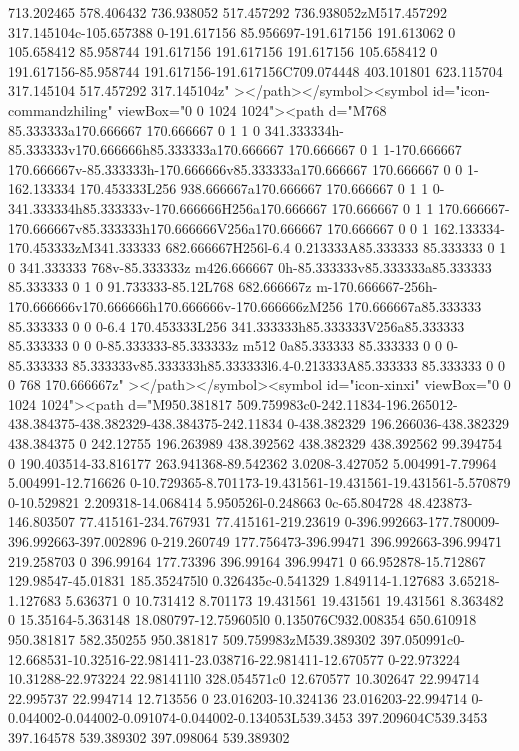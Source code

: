 {713.202465 578.406432 736.938052 517.457292 736.938052zM517.457292 317.145104c-105.657388 0-191.617156 85.956697-191.617156
191.613062 0 105.658412 85.958744 191.617156 191.617156 191.617156 105.658412 0 191.617156-85.958744
191.617156-191.617156C709.074448 403.101801 623.115704 317.145104 517.457292 317.145104z"  ></path></symbol><symbol
id="icon-commandzhiling" viewBox="0 0 1024 1024"><path d="M768 85.333333a170.666667 170.666667 0 1 1 0
341.333334h-85.333333v170.666666h85.333333a170.666667 170.666667 0 1 1-170.666667
170.666667v-85.333333h-170.666666v85.333333a170.666667 170.666667 0 0 1-162.133334 170.453333L256 938.666667a170.666667
170.666667 0 1 1 0-341.333334h85.333333v-170.666666H256a170.666667 170.666667 0 1 1
170.666667-170.666667v85.333333h170.666666V256a170.666667 170.666667 0 0 1 162.133334-170.453333zM341.333333 682.666667H256l-6.4
0.213333A85.333333 85.333333 0 1 0 341.333333 768v-85.333333z m426.666667 0h-85.333333v85.333333a85.333333 85.333333 0 1 0
91.733333-85.12L768 682.666667z m-170.666667-256h-170.666666v170.666666h170.666666v-170.666666zM256 170.666667a85.333333
85.333333 0 0 0-6.4 170.453333L256 341.333333h85.333333V256a85.333333 85.333333 0 0 0-85.333333-85.333333z m512 0a85.333333
85.333333 0 0 0-85.333333 85.333333v85.333333h85.333333l6.4-0.213333A85.333333 85.333333 0 0 0 768 170.666667z"
></path></symbol><symbol id="icon-xinxi" viewBox="0 0 1024 1024"><path d="M950.381817
509.759983c0-242.11834-196.265012-438.384375-438.382329-438.384375-242.11834 0-438.382329 196.266036-438.382329 438.384375 0
242.12755 196.263989 438.392562 438.382329 438.392562 99.394754 0 190.403514-33.816177 263.941368-89.542362 3.0208-3.427052
5.004991-7.79964 5.004991-12.716626 0-10.729365-8.701173-19.431561-19.431561-19.431561-5.570879 0-10.529821 2.209318-14.068414
5.950526l-0.248663 0c-65.804728 48.423873-146.803507 77.415161-234.767931 77.415161-219.23619
0-396.992663-177.780009-396.992663-397.002896 0-219.260749 177.756473-396.99471 396.992663-396.99471 219.258703 0 396.99164
177.73396 396.99164 396.99471 0 66.952878-15.712867 129.98547-45.01831 185.352475l0 0.326435c-0.541329 1.849114-1.127683
3.65218-1.127683 5.636371 0 10.731412 8.701173 19.431561 19.431561 19.431561 8.363482 0 15.35164-5.363148 18.080797-12.759605l0
0.135076C932.008354 650.610918 950.381817 582.350255 950.381817 509.759983zM539.389302
397.050991c0-12.668531-10.32516-22.981411-23.038716-22.981411-12.670577 0-22.973224 10.31288-22.973224 22.981411l0 328.054571c0
12.670577 10.302647 22.994714 22.995737 22.994714 12.713556 0 23.016203-10.324136 23.016203-22.994714
0-0.044002-0.044002-0.091074-0.044002-0.134053L539.3453 397.209604C539.3453 397.164578 539.389302 397.098064 539.389302
}
